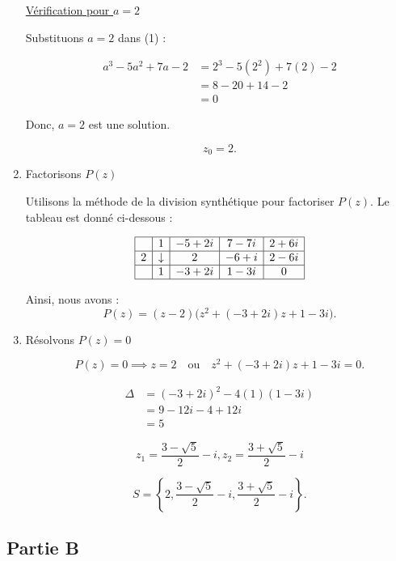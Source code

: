 \documentclass[12pt,a4paper]{article}
\begin{document}
\begin{enumerate}
\underline{Vérification pour $a = 2$}

Substituons $a = 2$ dans (1) :

\begin{align*}
a^3 - 5a^2 + 7a - 2 &= 2^3 - 5(2^2) + 7(2) - 2\\
										&=8 - 20 + 14 - 2\\
										&=0
\end{align*}

Donc, $a = 2$ est une solution.

\[
z_0 = 2.
\]

\item Factorisons $P(z)$

Utilisons la méthode de la division synthétique pour factoriser $P(z)$. Le tableau est donné ci-dessous :

\[
\begin{array}{|c|c|c|c|c|}
\hline
\text{ } & 1 & -5+2i & 7-7i & 2+6i \\ 
\hline
2 & \downarrow & 2 & -6+i & 2-6i \\ 
\hline
\text{ } & 1 & -3+2i & 1-3i & 0 \\ 
\hline
\end{array}
\]

Ainsi, nous avons :
\[
P(z) = (z - 2)\big(z^2 + (-3+2i)z + 1-3i\big).
\]

\item Résolvons $P(z) = 0$

\[
P(z) = 0 \implies z = 2 \quad \text{ou} \quad z^2 + (-3+2i)z + 1-3i = 0.
\]

\begin{align*}
\Delta &= (-3+2i)^2 - 4(1)(1-3i)\\
 			 &= 9 - 12i - 4 + 12i\\
	     &= 5
\end{align*}

\[
z_{1} = \frac{3-\sqrt{5}}{2}-i, z_{2} = \frac{3+\sqrt{5}}{2}-i
\]

\[
S = \left\{ 2, \frac{3-\sqrt{5}}{2}-i, \frac{3+\sqrt{5}}{2}-i \right\}.
\]

\end{enumerate}
\subsection*{ Partie B}
\end{document}

